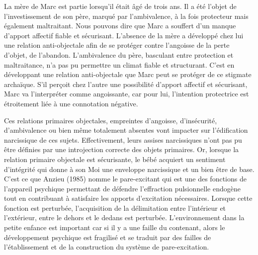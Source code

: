 \documentclass[12pt, a4paper]{book}
\begin{document}
\begin{spacing}{1.5}
La mère de Marc est partie lorsqu'il était âgé de trois ans. Il a été l'objet de l'investissement de son père, marqué par l'ambivalence, à la fois protecteur mais également maltraitant. Nous pouvons dire que Marc a souffert d'un manque d'apport affectif fiable et sécurisant. L'absence de la mère a développé chez lui une relation anti-objectale afin de se protéger contre l'angoisse de la perte d'objet, de l'abandon. L'ambivalence du père, basculant entre protection et maltraitance, n'a pas pu permettre un climat fiable et structurant. C'est en développant une relation anti-objectale que Marc peut se protéger de ce stigmate archaïque. S'il perçoit chez l'autre une possibilité d'apport affectif et sécurisant, Marc va l'interpréter comme angoissante, car pour lui, l'intention protectrice est étroitement liée à une connotation négative. 

Ces relations primaires objectales, empreintes d'angoisse, d'insécurité, d'ambivalence ou bien même totalement absentes vont impacter sur l'édification narcissique de ces sujets. Effectivement, leurs assises narcissiques n'ont pas pu être définies par une introjection correcte des objets primaires. Or, lorsque la relation primaire objectale est sécurisante, le bébé acquiert un sentiment d'intégrité qui donne à son Moi une enveloppe narcissique et un bien être de base. C'est ce que Anzieu (1985) nomme le pare-excitant qui est une des fonctions de l'appareil psychique permettant de défendre l'effraction pulsionnelle endogène tout en contribuant à satisfaire les apports d'excitation nécessaires. Lorsque cette fonction est perturbée, l'acquisition de la délimitation entre l'intérieur et l'extérieur, entre le dehors et le dedans est perturbée. L'environnement dans la petite enfance est important  car si il y a une faille du contenant, alors le développement psychique est fragilisé et se traduit par des failles de l'établissement et de la construction du système de pare-excitation. 


\end{spacing}
\end{document}

